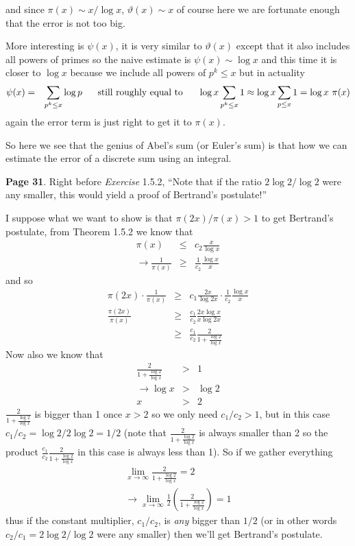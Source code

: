 \documentclass[aps,preprint,preprintnumbers,nofootinbib,showpacs,prd]{revtex4-1}
\newcommand{\nbea}{\begin{eqnarray*}}
\newcommand{\neea}{\end{eqnarray*}}
\begin{document}
and since $\pi(x) \sim x/\log x$, $\vartheta(x) \sim x$ of course here we are fortunate enough that the error is not too big.

More interesting is $\psi(x)$, it is very similar to $\vartheta(x)$ except that it also includes all powers of primes so the naive estimate is $\psi(x) \sim \log x$ and this time it is closer to $\log x$ because we include all powers of $p^k \le x$ but in actuality
%
\nbea
\psi(x) & = & \sum_{p^k \le x} \log p ~~~~~ {\rm still~roughly~equal~to} ~~~~~ \log x \sum_{p^k \le x} 1 \approx \log x \sum_{p \le x} 1 = \log x ~ \pi(x)
\neea
%
again the error term is just right to get it to $\pi(x)$.

So here we see that the genius of Abel's sum (or Euler's sum) is that how we can estimate the error of a discrete sum using an integral.





{\bf Page 31}. Right before {\it Exercise} 1.5.2, ``Note that if the ratio $2 \log 2/ \log 2$ were any smaller, this would yield a proof of Bertrand’s postulate!'' 

I suppose what we want to show is that $\pi(2x)/\pi(x) > 1$ to get Bertrand's postulate, from Theorem 1.5.2 we know that
%
\nbea
\pi(x) & \le & c_2 \frac{x}{\log x} \\
\to \frac{1}{\pi(x)} & \ge & \frac{1}{c_2} \frac{\log x}{x}
\neea
%
and so
%
\nbea
\pi(2x) \cdot \frac{1}{\pi(x)} & \ge & c_1 \frac{2x}{\log 2x} \cdot \frac{1}{c_2} \frac{\log x}{x} \\
\frac{\pi(2x)}{\pi(x)}& \ge & \frac{c_1}{c_2} \frac{2x \log x}{x \log 2x} \\
& \ge & \frac{c_1}{c_2} \frac{2}{1 + \frac{\log 2}{\log x}}
\neea
%
Now also we know that
%
\nbea
\frac{2}{1 + \frac{\log 2}{\log x}} & > & 1 \\
\to \log x & > & \log 2 \\
x & > & 2
\neea
%
$\frac{2}{1 + \frac{\log 2}{\log x}}$ is bigger than 1 once $x > 2$ so we only need $c_1 / c_2 > 1$, but in this case $c_1 / c_2 = \log 2 / 2 \log 2 = 1/2$ (note that $\frac{2}{1 + \frac{\log 2}{\log x}}$ is always smaller than 2 so the product $\frac{c_1}{c_2}\frac{2}{1 + \frac{\log 2}{\log x}}$ in this case is always less than 1). So if we gather everything
%
\nbea
\lim_{x\to\infty} \frac{2}{1 + \frac{\log 2}{\log x}} = 2 \\
\to \lim_{x\to\infty} \frac{1}{2} \left (\frac{2}{1 + \frac{\log 2}{\log x}} \right ) = 1
\neea
%
thus if the constant multiplier, $c_1/c_2$, is {\it any} bigger than $1/2$ (or in other words $c_2/c_1 = 2 \log 2/\log 2$ were any smaller) then we'll get Bertrand's postulate.
\end{document}
